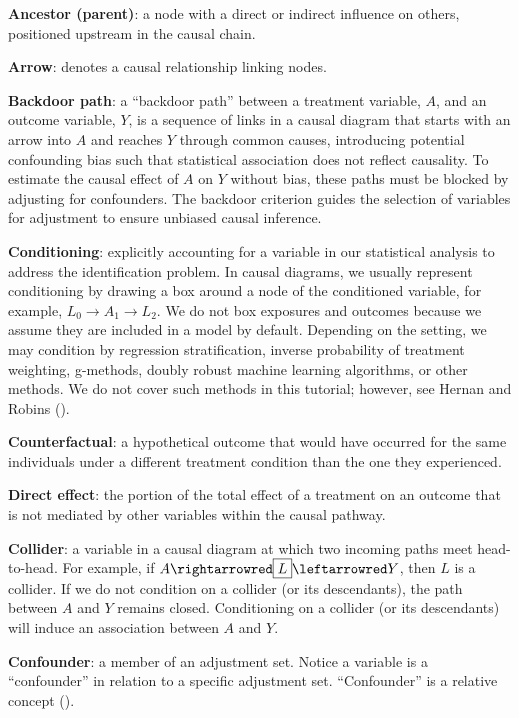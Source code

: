 \documentclass[
  singlecolumn]{article}
\begin{document}
\textbf{Ancestor (parent)}: a node with a direct or indirect influence
on others, positioned upstream in the causal chain.

\textbf{Arrow}: denotes a causal relationship linking nodes.

\textbf{Backdoor path}: a ``backdoor path'' between a treatment
variable, \(A\), and an outcome variable, \(Y\), is a sequence of links
in a causal diagram that starts with an arrow into \(A\) and reaches
\(Y\) through common causes, introducing potential confounding bias such
that statistical association does not reflect causality. To estimate the
causal effect of \(A\) on \(Y\) without bias, these paths must be
blocked by adjusting for confounders. The backdoor criterion guides the
selection of variables for adjustment to ensure unbiased causal
inference.

\textbf{Conditioning}: explicitly accounting for a variable in our
statistical analysis to address the identification problem. In causal
diagrams, we usually represent conditioning by drawing a box around a
node of the conditioned variable, for example,
\(\boxed{L_{0}}\to A_{1} \to L_{2}\). We do not box exposures and
outcomes because we assume they are included in a model by default.
Depending on the setting, we may condition by regression stratification,
inverse probability of treatment weighting, g-methods, doubly robust
machine learning algorithms, or other methods. We do not cover such
methods in this tutorial; however, see Hernan and Robins
().

\textbf{Counterfactual}: a hypothetical outcome that would have occurred
for the same individuals under a different treatment condition than the
one they experienced.

\textbf{Direct effect}: the portion of the total effect of a treatment
on an outcome that is not mediated by other variables within the causal
pathway.

\textbf{Collider}: a variable in a causal diagram at which two incoming
paths meet head-to-head. For example, if
\(A \rightarrowred \boxed{L} \leftarrowred Y\), then \(L\) is a
collider. If we do not condition on a collider (or its descendants), the
path between \(A\) and \(Y\) remains closed. Conditioning on a collider
(or its descendants) will induce an association between \(A\) and \(Y\).

\textbf{Confounder}: a member of an adjustment set. Notice a variable is
a ``confounder'' in relation to a specific adjustment set.
``Confounder'' is a relative concept ().
\end{document}
